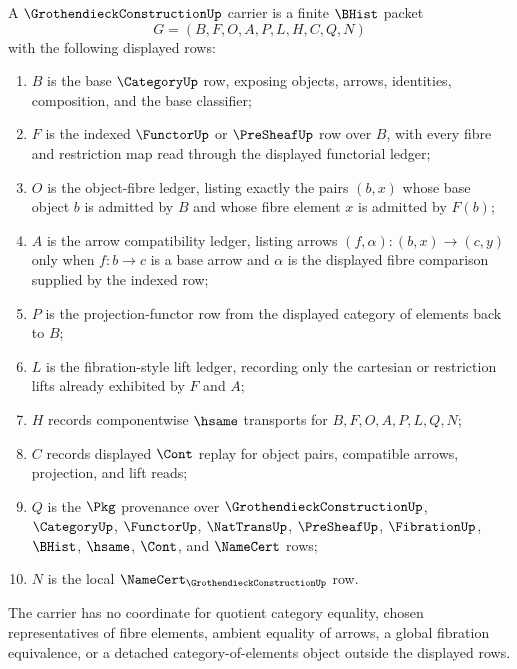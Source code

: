 \begin{definition}
\label{def:grothendieck-construction-carrier}
A $\GrothendieckConstructionUp$ carrier is a finite $\BHist$ packet
$$
G=(B,F,O,A,P,L,H,C,Q,N)
$$
with the following displayed rows:
\begin{enumerate}
\item $B$ is the base $\CategoryUp$ row, exposing objects, arrows, identities, composition, and the base classifier;
\item $F$ is the indexed $\FunctorUp$ or $\PreSheafUp$ row over $B$, with every fibre and restriction map read through the displayed functorial ledger;
\item $O$ is the object-fibre ledger, listing exactly the pairs $(b,x)$ whose base object $b$ is admitted by $B$ and whose fibre element $x$ is admitted by $F(b)$;
\item $A$ is the arrow compatibility ledger, listing arrows $(f,\alpha):(b,x)\to(c,y)$ only when $f:b\to c$ is a base arrow and $\alpha$ is the displayed fibre comparison supplied by the indexed row;
\item $P$ is the projection-functor row from the displayed category of elements back to $B$;
\item $L$ is the fibration-style lift ledger, recording only the cartesian or restriction lifts already exhibited by $F$ and $A$;
\item $H$ records componentwise $\hsame$ transports for $B,F,O,A,P,L,Q,N$;
\item $C$ records displayed $\Cont$ replay for object pairs, compatible arrows, projection, and lift reads;
\item $Q$ is the $\Pkg$ provenance over $\GrothendieckConstructionUp$, $\CategoryUp$, $\FunctorUp$, $\NatTransUp$, $\PreSheafUp$, $\FibrationUp$, $\BHist$, $\hsame$, $\Cont$, and $\NameCert$ rows;
\item $N$ is the local $\NameCert_{\GrothendieckConstructionUp}$ row.
\end{enumerate}
The carrier has no coordinate for quotient category equality, chosen representatives of fibre elements, ambient equality of arrows, a global fibration equivalence, or a detached category-of-elements object outside the displayed rows.
\end{definition}

